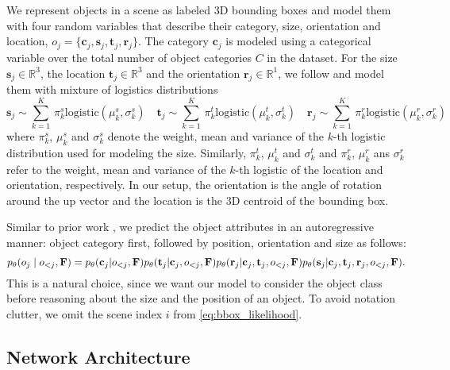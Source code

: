 \documentclass{article}
\newcommand{\bc}{\mathbf{c}}\newcommand{\bC}{\mathbf{C}}
\newcommand{\br}{\mathbf{r}}\newcommand{\bR}{\mathbf{R}}
\newcommand{\bs}{\mathbf{s}}\newcommand{\bS}{\mathbf{S}}
\newcommand{\bt}{\mathbf{t}}\newcommand{\bT}{\mathbf{T}}
\newcommand{\boldparagraph}[1]{\vspace{0.2cm}\noindent{\bf #1:} }
\begin{document}
\boldparagraph{Modelling Object Attributes}We represent objects in a scene as labeled 3D bounding boxes and model them
with four random variables that describe their category, size, orientation and
location, $o_j = \{\bc_j, \bs_j, \bt_j, \br_j\}$. The category
$\bc_j$ is modeled using a categorical variable over the total number of
object categories $C$ in the dataset. For the size $\bs_j \in \mathbb{R}^3$, the
location $\bt_j \in \mathbb{R}^3$ and the orientation $\br_j \in \mathbb{R}^1$,
we follow \cite{Salimans2017ICLR, Oord2016SSW} and model them with mixture
of logistics distributions
\begin{equation}
    \bs_j \sim \sum_{k=1}^K \, \pi_k^s \text{logistic}(\mu_k^s, \sigma_k^s)\quad
    \bt_j \sim \sum_{k=1}^K \, \pi_k^t \text{logistic}(\mu_k^t, \sigma_k^t)\quad
    \br_j \sim \sum_{k=1}^K \, \pi_k^r \text{logistic}(\mu_k^r, \sigma_k^r)
\end{equation}
where $\pi_k^s$, $\mu_k^s$ and $\sigma_k^s$ denote the
weight, mean and variance of the $k$-th logistic distribution used for
modeling the size. Similarly, $\pi_k^t$, $\mu_k^t$ and $\sigma_k^t$ and
$\pi_k^r$, $\mu_k^r$ ans $\sigma_k^r$ refer to the weight, mean and variance of
the $k$-th logistic of the location and orientation, respectively. In our
setup, the orientation is the angle of rotation around the up vector and the
location is the 3D centroid of the bounding box.

Similar to prior work \cite{Ritchie2019CVPR, Wang2020ARXIV}, we predict the
object attributes in an autoregressive manner: object category first, followed
by position, orientation and size as follows:
\begin{equation}
    p_{\theta}(o_j \mid o_{<j}, \bF) = p_{\theta}(\bc_j | o_{<j}, \bF)p_{\theta}(\bt_j |\bc_j, o_{<j}, \bF)
               p_{\theta}(\br_j |\bc_j, \bt_j, o_{<j}, \bF)p_{\theta}(\bs_j |\bc_j, \bt_j, \br_j, o_{<j}, \bF).
    \label{eq:bbox_likelihood}
\end{equation}
This is a natural choice, since we want our model to consider the object class
before reasoning about the size and the position of an object. To avoid
notation clutter, we omit the scene index $i$ from \eqref{eq:bbox_likelihood}.

\vspace{-2mm}
\subsection{Network Architecture}\label{subsec:network_architecture}
\end{document}
